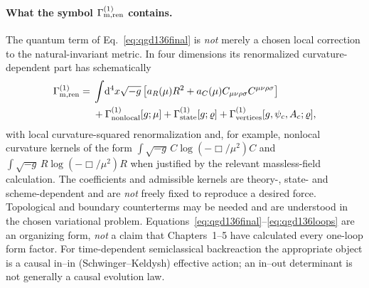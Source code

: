 \documentclass[11pt,a4paper]{article}
\newcommand{\dd}{\mathrm d}
\begin{document}
\paragraph{What the symbol $\Gamma_{\rm m,ren}^{(1)}$ contains.}
The quantum term of Eq.~\eqref{eq:qgd136final} is \emph{not} merely a
chosen local correction to the natural-invariant metric. In four dimensions
its renormalized curvature-dependent part has schematically
\begin{equation}\label{eq:qgd136loops}
\begin{aligned}
\Gamma_{\rm m,ren}^{(1)}={}&
\int\!\dd^4x\sqrt{-g}\,
\bigl[a_R(\mu)R^2+a_C(\mu)C_{\mu\nu\rho\sigma}C^{\mu\nu\rho\sigma}\bigr]
\\&+\Gamma_{\rm nonlocal}^{(1)}[g;\mu]
+\Gamma_{\rm state}^{(1)}[g;\varrho]
+\Gamma_{\rm vertices}^{(1)}[g,\psi_c,A_c;\varrho],
\end{aligned}
\end{equation}
with local curvature-squared renormalization and, for example,
nonlocal curvature kernels of the form
$\int\sqrt{-g}\,C\log(-\Box/\mu^2)C$ and
$\int\sqrt{-g}\,R\log(-\Box/\mu^2)R$ when justified by the
relevant massless-field calculation. The coefficients and admissible
kernels are theory-, state- and scheme-dependent and are \emph{not}
freely fixed to reproduce a desired force. Topological and boundary
counterterms may be needed and are understood in the chosen variational
problem. Equations~\eqref{eq:qgd136final}--\eqref{eq:qgd136loops} are an
organizing form, \emph{not} a claim that Chapters~1--5 have calculated
every one-loop form factor. For time-dependent semiclassical backreaction
the appropriate object is a causal in--in (Schwinger--Keldysh) effective
action; an in--out determinant is not generally a causal evolution law.
\end{document}
